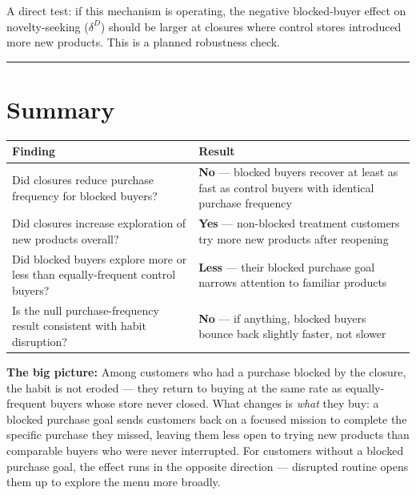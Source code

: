 \documentclass[
  letterpaper,
  DIV=11,
  numbers=noendperiod]{scrartcl}
\newcounter{none} %
\begin{document}
A direct test: if this mechanism is operating, the negative
blocked-buyer effect on novelty-seeking (\(\delta^D\)) should be larger
at closures where control stores introduced more new products. This is a
planned robustness check.

\begin{center}\rule{0.5\linewidth}{0.5pt}\end{center}

\section{Summary}\label{summary}

{\def\LTcaptype{none} %
\begin{longtable}[]{@{}
  >{\raggedright\arraybackslash}p{}
  >{\raggedright\arraybackslash}p{}@{}}
\toprule\noalign{}
\begin{minipage}[b]{\linewidth}\raggedright
Finding
\end{minipage} & \begin{minipage}[b]{\linewidth}\raggedright
Result
\end{minipage} \\
\midrule\noalign{}
\endhead
\bottomrule\noalign{}
\endlastfoot
Did closures reduce purchase frequency for blocked buyers? & \textbf{No}
--- blocked buyers recover at least as fast as control buyers with
identical purchase frequency \\
Did closures increase exploration of new products overall? &
\textbf{Yes} --- non-blocked treatment customers try more new products
after reopening \\
Did blocked buyers explore more or less than equally-frequent control
buyers? & \textbf{Less} --- their blocked purchase goal narrows
attention to familiar products \\
Is the null purchase-frequency result consistent with habit disruption?
& \textbf{No} --- if anything, blocked buyers bounce back slightly
faster, not slower \\
\end{longtable}
}

\textbf{The big picture:} Among customers who had a purchase blocked by
the closure, the habit is not eroded --- they return to buying at the
same rate as equally-frequent buyers whose store never closed. What
changes is \emph{what} they buy: a blocked purchase goal sends customers
back on a focused mission to complete the specific purchase they missed,
leaving them less open to trying new products than comparable buyers who
were never interrupted. For customers without a blocked purchase goal,
the effect runs in the opposite direction --- disrupted routine opens
them up to explore the menu more broadly.
\end{document}
